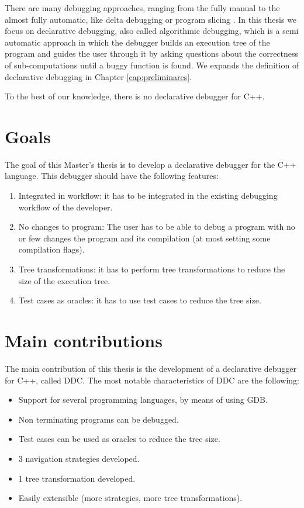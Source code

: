 There are many debugging approaches, ranging from the fully manual to the almost fully automatic, like delta debugging or program slicing \cite{WhyProgramsFail}. In this thesis we focus on declarative debugging, also called algorithmic debugging, which is a semi automatic approach in which the debugger builds an execution tree of the program and guides the user through it by asking questions about the correctness of sub-computations until a buggy function is found. We expands the definition of declarative debugging in Chapter \ref{cap:preliminares}.



To the best of our knowledge, there is no declarative debugger for C++.

\section{Goals}
The goal of this Master's thesis is to develop a declarative debugger for the C++ language.
This debugger should have the following features:
\begin{enumerate}
  \item Integrated in workflow: it has to be integrated in the existing debugging workflow of the developer. \label{goal1}
  \item No changes to program: The user has to be able to debug a program with no or few changes the program and its compilation (at most setting some compilation flags). \label{goal2}
  \item Tree transformations: it has to perform tree transformations to reduce the size of the execution tree. \label{goal3}
  \item Test cases as oracles: it has to use test cases to reduce the tree size. \label{goal4}
\end{enumerate}

\section{Main contributions}

The main contribution of this thesis is the development of a declarative debugger for C++, called DDC.
%
The most notable characteristics of DDC are the following:
\begin{itemize}
\item Support for several programming languages, by means of using GDB.
\item Non terminating programs can be debugged.
\item Test cases can be used as oracles to reduce the tree size.
\item 3 navigation strategies developed.
\item 1 tree transformation developed.
\item Easily extensible (more strategies, more tree transformations).
\end{itemize}

